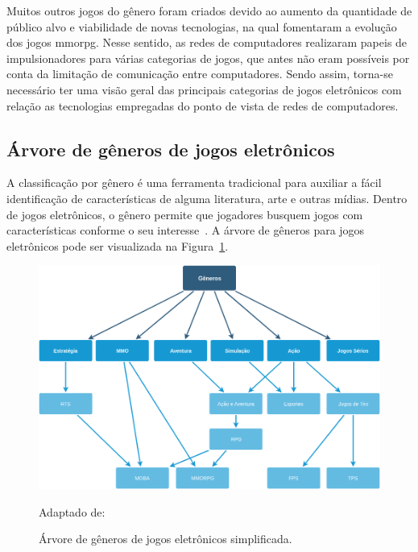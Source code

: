Muitos outros jogos do gênero foram criados devido ao aumento da quantidade de público alvo e viabilidade de novas tecnologias, na qual fomentaram a evolução dos jogos \ac{mmorpg}.
%
Nesse sentido, as redes de computadores realizaram papeis de impulsionadores para várias categorias de jogos, que antes não eram possíveis por conta da limitação de comunicação entre computadores.
%
Sendo assim, torna-se necessário ter uma visão geral das principais categorias de jogos eletrônicos com relação as tecnologias empregadas do ponto de vista de redes de computadores.



\subsection{Árvore de gêneros de jogos eletrônicos}
\label{sec:arvore_generos}


A classificação por gênero é uma ferramenta tradicional para auxiliar a fácil identificação de características de alguma literatura, arte e outras mídias.
%
Dentro de jogos eletrônicos, o gênero permite que jogadores busquem jogos com características conforme o seu interesse~\cite{Clarke2015}.
%
A árvore de gêneros para jogos eletrônicos pode ser visualizada na Figura~\ref{fig:generos}.


\begin{figure}[htb!]
\caption{Árvore de gêneros de jogos eletrônicos simplificada.}
\label{fig:generos}
\includegraphics[width=\textwidth]{img/cap2/generos.png}
\centering

Adaptado de:~\cite{adams_1208533}
\end{figure}



